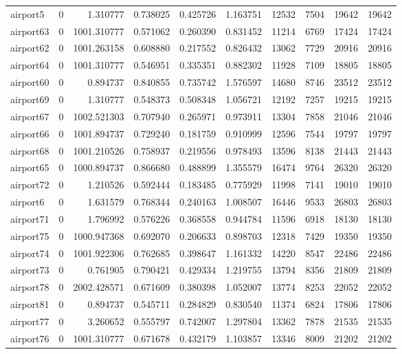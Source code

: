 \begin{longtable}{|l|r|r|r|r|r|r|r|r|r|}
airport5 & 0 & 1.310777 & 0.738025 & 0.425726 & 1.163751 & 12532 & 7504 & 19642 & 19642 \\
airport63 & 0 & 1001.310777 & 0.571062 & 0.260390 & 0.831452 & 11214 & 6769 & 17424 & 17424 \\
airport62 & 0 & 1001.263158 & 0.608880 & 0.217552 & 0.826432 & 13062 & 7729 & 20916 & 20916 \\
airport64 & 0 & 1001.310777 & 0.546951 & 0.335351 & 0.882302 & 11928 & 7109 & 18805 & 18805 \\
airport60 & 0 & 0.894737 & 0.840855 & 0.735742 & 1.576597 & 14680 & 8746 & 23512 & 23512 \\
airport69 & 0 & 1.310777 & 0.548373 & 0.508348 & 1.056721 & 12192 & 7257 & 19215 & 19215 \\
airport67 & 0 & 1002.521303 & 0.707940 & 0.265971 & 0.973911 & 13304 & 7858 & 21046 & 21046 \\
airport66 & 0 & 1001.894737 & 0.729240 & 0.181759 & 0.910999 & 12596 & 7544 & 19797 & 19797 \\
airport68 & 0 & 1001.210526 & 0.758937 & 0.219556 & 0.978493 & 13596 & 8138 & 21443 & 21443 \\
airport65 & 0 & 1000.894737 & 0.866680 & 0.488899 & 1.355579 & 16474 & 9764 & 26320 & 26320 \\
airport72 & 0 & 1.210526 & 0.592444 & 0.183485 & 0.775929 & 11998 & 7141 & 19010 & 19010 \\
airport6 & 0 & 1.631579 & 0.768344 & 0.240163 & 1.008507 & 16446 & 9533 & 26803 & 26803 \\
airport71 & 0 & 1.796992 & 0.576226 & 0.368558 & 0.944784 & 11596 & 6918 & 18130 & 18130 \\
airport75 & 0 & 1000.947368 & 0.692070 & 0.206633 & 0.898703 & 12318 & 7429 & 19350 & 19350 \\
airport74 & 0 & 1001.922306 & 0.762685 & 0.398647 & 1.161332 & 14220 & 8547 & 22486 & 22486 \\
airport73 & 0 & 0.761905 & 0.790421 & 0.429334 & 1.219755 & 13794 & 8356 & 21809 & 21809 \\
airport78 & 0 & 2002.428571 & 0.671609 & 0.380398 & 1.052007 & 13774 & 8253 & 22052 & 22052 \\
airport81 & 0 & 0.894737 & 0.545711 & 0.284829 & 0.830540 & 11374 & 6824 & 17806 & 17806 \\
airport77 & 0 & 3.260652 & 0.555797 & 0.742007 & 1.297804 & 13362 & 7878 & 21535 & 21535 \\
airport76 & 0 & 1001.310777 & 0.671678 & 0.432179 & 1.103857 & 13346 & 8009 & 21202 & 21202 \\

\end{longtable}

